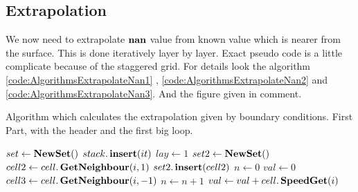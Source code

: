\subsection{Extrapolation}

We now need to extrapolate $\mathop{\textbf{nan}}$ value from known value which is nearer from the surface.
This is done iteratively layer by layer.
Exact pseudo code is a little complicate because of the staggered grid. For details look the algorithm  \ref{code:AlgorithmsExtrapolateNan1}
, \ref{code:AlgorithmsExtrapolateNan2} and \ref{code:AlgorithmsExtrapolateNan3}. And the figure given in comment.

\begin{algorithm}
\caption{Algorithm which calculates the extrapolation given by boundary conditions. First Part, with the header and the first big loop.}
\label{code:AlgorithmsExtrapolateNan1}
\begin{algorithmic}[1]
\State $set \gets \mathop{\textbf{NewSet}}()$
	\State  $stack.\mathop{\textbf{insert}}(it)$ 
	\EndIf
	\EndFor
	\State $lay \gets 1$
	\Loop
	\State $set2 \gets \mathop{\textbf{NewSet}}()$
	 
		\State $cell2 \gets cell.\mathop{\textbf{GetNeighbour}}(i,1)$ 
			 
				\State $set2.\mathop{\textbf{insert}}(cell2)$
			\EndIf
			 
			\State $n \gets 0$ 
			\State $val \gets 0$ 
			 
				 
				 
					\State $cell3 \gets cell.\mathop{\textbf{GetNeighbour}}(i,-1)$
						\State $n\gets n+1$
						\State $val \gets val+cell.\mathop{\textbf{SpeedGet}}(i)$

\end{algorithmic}
\end{algorithm}
